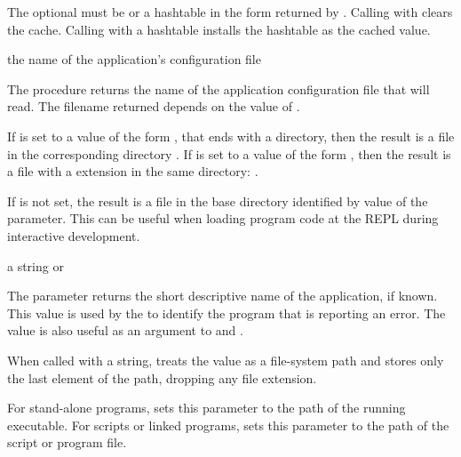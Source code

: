 The optional  must be  or a hashtable in the form returned by
.
Calling  with  clears the cache.
Calling  with a hashtable installs the hashtable as the cached value.

\begin{procedure}
\end{procedure}
\returns{} the name of the application's configuration file

The  procedure returns the name of the application
configuration file that  will read.
The filename returned depends on the value of .

If  is set to a value of the form
,
that ends with a  directory,
then the result is a  file in the corresponding  directory
.
If  is set to a value of the form
,
then the result is a file with a  extension in the same directory:
.

If  is not set, the result is a  file in the base
directory identified by value of the  parameter.
This can be useful when loading program code at the REPL during interactive
development.

\begin{parameter}
\end{parameter}
\hasvalue{} a string or 

The  parameter returns the short descriptive name of the
application, if known.
This value is used by the  to identify the program
that is reporting an error.
The value is also useful as an argument to  and
.

When called with a string,  treats the value as
a file-system path and stores only the last element of the path,
dropping any file extension.

For stand-alone programs, 
sets this parameter to the path of the running executable.
For scripts or linked programs, 
sets this parameter to the path of the script or program file.

